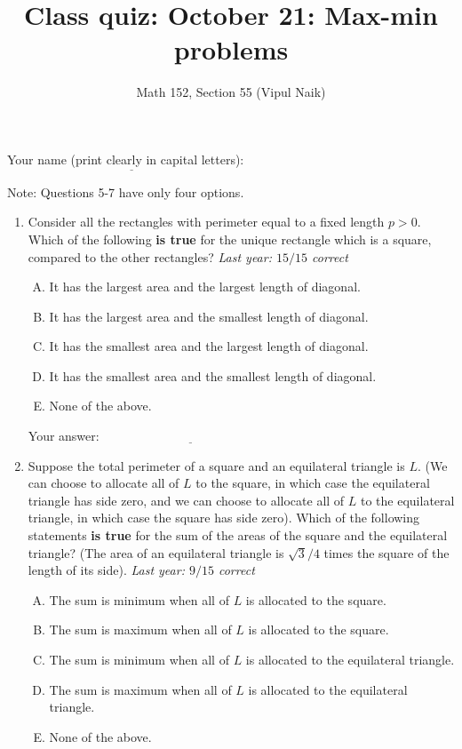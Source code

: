 \documentclass[10pt]{amsart}
\title{Class quiz: October 21: Max-min problems}
\author{Math 152, Section 55 (Vipul Naik)}
\begin{document}
\maketitle

Your name (print clearly in capital letters): $\underline{\qquad\qquad\qquad\qquad\qquad\qquad\qquad\qquad\qquad\qquad}$

Note: Questions 5-7 have only four options.
\begin{enumerate}

\item Consider all the rectangles with perimeter equal to a fixed
  length $p > 0$. Which of the following {\bf is true} for the unique
  rectangle which is a square, compared to the other rectangles? {\em
  Last year: $15/15$ correct}

  \begin{enumerate}[(A)]
  \item It has the largest area and the largest length of diagonal.
  \item It has the largest area and the smallest length of diagonal.
  \item It has the smallest area and the largest length of diagonal.
  \item It has the smallest area and the smallest length of diagonal.
  \item None of the above.
  \end{enumerate}

  \vspace{0.1in}
  Your answer: $\underline{\qquad\qquad\qquad\qquad\qquad\qquad\qquad}$
  \vspace{0.6in}

\item Suppose the total perimeter of a square and an equilateral
  triangle is $L$. (We can choose to allocate all of $L$ to the
  square, in which case the equilateral triangle has side zero, and we
  can choose to allocate all of $L$ to the equilateral triangle, in
  which case the square has side zero). Which of the following
  statements {\bf is true} for the sum of the areas of the square and
  the equilateral triangle? (The area of an equilateral triangle is
  $\sqrt{3}/4$ times the square of the length of its side). {\em Last
  year: $9/15$ correct}
  \begin{enumerate}[(A)]
  \item The sum is minimum when all of $L$ is allocated to the square.
  \item The sum is maximum when all of $L$ is allocated to the square.
  \item The sum is minimum when all of $L$ is allocated to the
    equilateral triangle.
  \item The sum is maximum when all of $L$ is allocated to the
    equilateral triangle.
  \item None of the above.
  \end{enumerate}


\end{enumerate}
\end{document}
